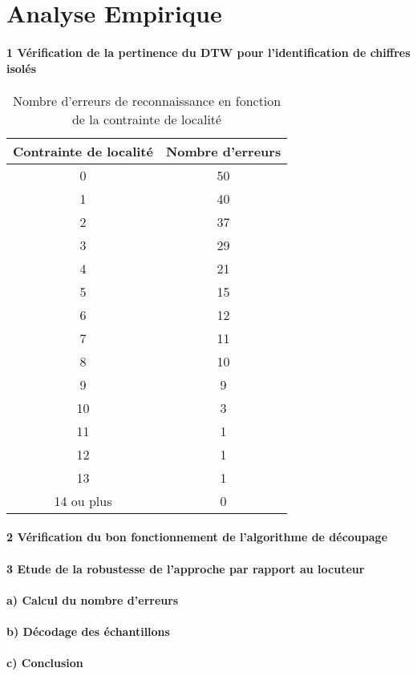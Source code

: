 \documentclass[a4paper,11pt]{article}
\begin{document}
\part{Analyse Empirique}

\subsection*{1 Vérification de la pertinence du DTW pour l'identification de chiffres isolés}

\label{tableau}

\begin{center}


\begin{table}[H]

\begin{tabular}{|c|c|}

\hline
Contrainte de localité & Nombre d'erreurs \\
\hline
0 & 50 \\
\hline
1 & 40 \\
\hline
2 & 37 \\
\hline
3 & 29 \\
\hline
4 & 21 \\
\hline
5 & 15 \\
\hline
6 & 12 \\
\hline
7 & 11 \\
\hline
8 & 10 \\
\hline
9 & 9 \\
\hline
10 & 3 \\
\hline
11 & 1 \\
\hline
12 & 1 \\
\hline
13 & 1 \\
\hline
14 ou plus & 0 \\
\hline



\end{tabular}
\caption{Nombre d'erreurs de reconnaissance en fonction de la contrainte de localité\protect\footnotemark}
 
\end{table}
\end{center}

\subsection*{2  Vérification du bon fonctionnement de l'algorithme de découpage}

\subsection*{3  Etude de la robustesse de l'approche par rapport au locuteur}

\subsection*{a) Calcul du nombre d'erreurs}

\subsection*{b) Décodage des échantillons}

\subsection*{c) Conclusion}
\end{document}
